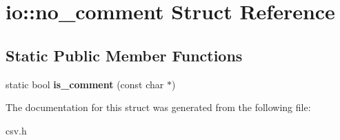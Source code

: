\section{io\+:\+:no\+\_\+comment Struct Reference}
\label{structio_1_1no__comment}
\subsection*{Static Public Member Functions}
\begin{DoxyCompactItemize}
\item 
static bool {\bfseries is\+\_\+comment} (const char $\ast$)\label{structio_1_1no__comment_a52b252547482e28edd076ee2224bc8d8}

\end{DoxyCompactItemize}


The documentation for this struct was generated from the following file\+:\begin{DoxyCompactItemize}
\item 
csv.\+h\end{DoxyCompactItemize}
